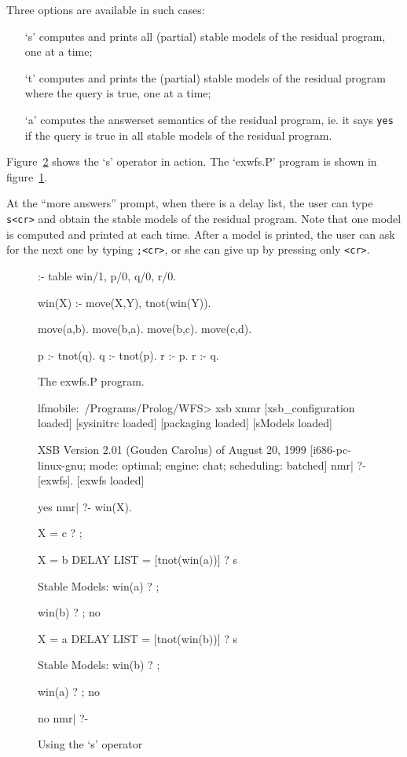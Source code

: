 \documentclass{article}
\begin{document}
Three options are available in such cases: 

\begin{enumerate}

\item[`s'] computes and prints all (partial) stable models of the residual
  program, one at a time;

\item[`t'] computes and prints the (partial) stable models of the residual
  program where the query is true, one at a time;

\item[`a'] computes the answerset semantics of the residual program,
  ie. it says \verb#yes# if the query is true in all stable models of the
  residual program.

\end{enumerate}

Figure~\ref{fig:stable} shows the `s' operator in action. The
`exwfs.P' program is shown in figure~\ref{fig:exwfs}. 

At the ``more answers'' prompt, when there is a delay list, the user
can type \verb#s<cr># and obtain the stable models of the residual program.
Note that one model is computed and printed at each time. After a
model is printed, the user can ask for the next one by typing \verb#;<cr>#,
or she can give up by pressing only \verb#<cr>#.

\begin{figure}
\label{fig:exwfs}
\centering
\scriptsize
\begin{boxedverbatim}
:- table win/1, p/0, q/0, r/0.

win(X) :- move(X,Y), tnot(win(Y)).

move(a,b).
move(b,a).
move(b,c).
move(c,d).

p :- tnot(q).
q :- tnot(p).
r :- p.
r :- q.
\end{boxedverbatim}
\caption{The exwfs.P program.}
\end{figure}

\begin{figure}
\label{fig:stable}
\centering
\scriptsize
\begin{boxedverbatim}
lfmobile:~/Programs/Prolog/WFS> xsb xnmr
[xsb_configuration loaded]
[sysinitrc loaded]
[packaging loaded]
[sModels loaded]

XSB Version 2.01 (Gouden Carolus) of August 20, 1999
[i686-pc-linux-gnu; mode: optimal; engine: chat; scheduling: batched]
nmr| ?- [exwfs].
[exwfs loaded]

yes
nmr| ?- win(X).

X = c ? ;

X = b
DELAY LIST = [tnot(win(a))] ? s

Stable Models: 
  {win(a)} ? ;

  {win(b)} ? ;
  no

X = a
DELAY LIST = [tnot(win(b))] ? s

Stable Models: 
  {win(b)} ? ;

  {win(a)} ? ;
  no

no
nmr| ?- 
\end{boxedverbatim}
\caption{Using the `s' operator}
\end{figure}
\end{document}
